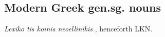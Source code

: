 \subsection{Modern Greek gen.sg. nouns}

\emph{Lexiko tis koinis neoellinikis} \citep{LKN}, henceforth LKN.

\citep{Sims2006}

\citet{Idsardi1992}
